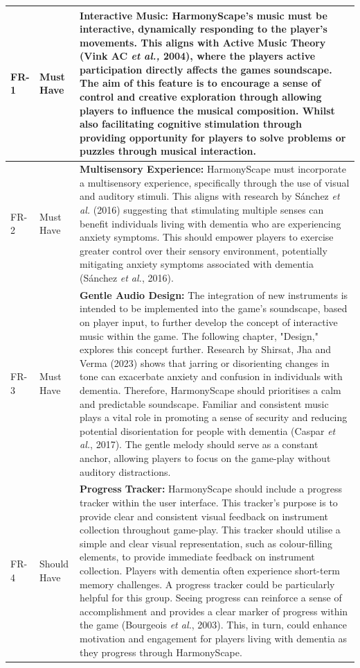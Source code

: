 \documentclass{l4proj}
\begin{document}
\begin{longtable}{|p{1.5cm}|p{1.5cm}|p{10cm}|}
FR-1 & Must Have & \textbf{Interactive Music:} HarmonyScape's music must be interactive, dynamically responding to the player's movements. This aligns with Active Music Theory (Vink AC \emph{et al.,} 2004), where the players active participation directly affects the games soundscape. The aim of this feature is to encourage a sense of control and creative exploration through allowing players to influence the musical composition. Whilst also facilitating cognitive stimulation through providing opportunity for players to solve problems or puzzles through musical interaction. \\ 
\hline
FR-2 & Must Have & \textbf{Multisensory Experience:} HarmonyScape must incorporate a multisensory experience, specifically through the use of visual and auditory stimuli. This aligns with research by Sánchez \emph{et al.} (2016) suggesting that stimulating multiple senses can benefit individuals living with dementia who are experiencing anxiety symptoms. This should empower players to exercise greater control over their sensory environment, potentially mitigating anxiety symptoms associated with dementia (Sánchez \emph{et al.}, 2016). \\
\hline 
FR-3 & Must Have & \textbf{Gentle Audio Design:} The integration of new instruments is intended to be implemented into the game's soundscape, based on player input, to further develop the concept of interactive music within the game. The following chapter, "Design," explores this concept further. Research by Shirsat, Jha and Verma (2023) shows that jarring or disorienting changes in tone can exacerbate anxiety and confusion in individuals with dementia. Therefore, HarmonyScape should prioritises a calm and predictable soundscape. Familiar and consistent music plays a vital role in promoting a sense of security and reducing potential disorientation for people with dementia (Caspar \emph{et al.}, 2017). The gentle melody should serve as a constant anchor, allowing players to focus on the game-play without auditory distractions.  \\ 
\hline
FR-4 & Should Have & \textbf{Progress Tracker:} HarmonyScape should include a progress tracker within the user interface. This tracker's purpose is to provide clear and consistent visual feedback on instrument collection throughout game-play. This tracker should utilise a simple and clear visual representation, such as colour-filling elements, to provide immediate feedback on instrument collection. Players with dementia often experience short-term memory challenges. A progress tracker could be particularly helpful for this group. Seeing progress can reinforce a sense of accomplishment and provides a clear marker of progress within the game (Bourgeois \emph{et al.}, 2003). This, in turn, could enhance motivation and engagement for players living with dementia as they progress through HarmonyScape. \\ 

\end{longtable}
\end{document}
